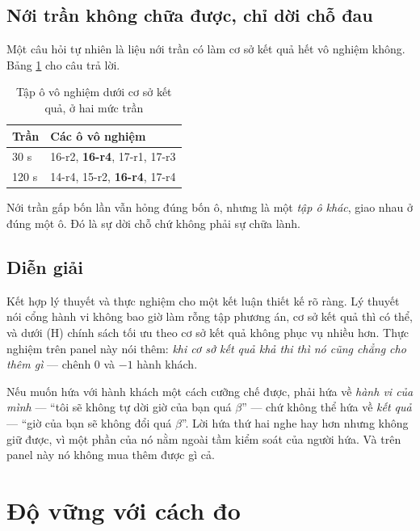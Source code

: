 \subsection{Nới trần không chữa được, chỉ dời chỗ đau}

Một câu hỏi tự nhiên là liệu nới trần có làm cơ sở kết quả hết vô nghiệm không. Bảng
\ref{bang:doicho} cho câu trả lời.

\begin{table}[htbp]
\centering
\caption{Tập ô vô nghiệm dưới cơ sở kết quả, ở hai mức trần}
\label{bang:doicho}
\small
\begin{tabular}{@{}ll@{}}
\toprule
\textbf{Trần} & \textbf{Các ô vô nghiệm}\\
\midrule
30 s & 16-r2, \textbf{16-r4}, 17-r1, 17-r3\\
120 s & 14-r4, 15-r2, \textbf{16-r4}, 17-r4\\
\bottomrule
\end{tabular}
\end{table}

Nới trần gấp bốn lần vẫn hỏng đúng bốn ô, nhưng là một \emph{tập ô khác}, giao nhau ở đúng một
ô. Đó là sự dời chỗ chứ không phải sự chữa lành.

\subsection{Diễn giải}

Kết hợp lý thuyết và thực nghiệm cho một kết luận thiết kế rõ ràng. Lý thuyết nói cổng hành vi
không bao giờ làm rỗng tập phương án, cơ sở kết quả thì có thể, và dưới (H) chính sách tối ưu
theo cơ sở kết quả không phục vụ nhiều hơn. Thực nghiệm trên panel này nói thêm: \emph{khi cơ sở
kết quả khả thi thì nó cũng chẳng cho thêm gì} --- chênh 0 và $-1$ hành khách.

\begin{khungy}
Nếu muốn hứa với hành khách một cách cưỡng chế được, phải hứa về \emph{hành vi của mình} ---
``tôi sẽ không tự dời giờ của bạn quá $\beta$'' --- chứ không thể hứa về \emph{kết quả} ---
``giờ của bạn sẽ không đổi quá $\beta$''. Lời hứa thứ hai nghe hay hơn nhưng không giữ được, vì
một phần của nó nằm ngoài tầm kiểm soát của người hứa. Và trên panel này nó không mua thêm được
gì cả.
\end{khungy}

\section{Độ vững với cách đo}
\label{muc:dovung}

